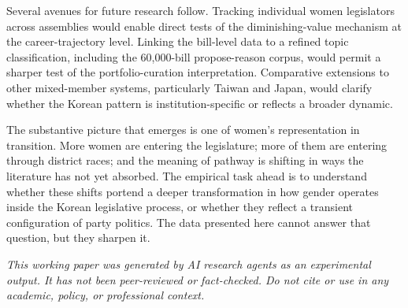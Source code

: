 \documentclass[11pt]{article}
\begin{document}
Several avenues for future research follow. Tracking individual women legislators across assemblies would enable direct tests of the diminishing-value mechanism at the career-trajectory level. Linking the bill-level data to a refined topic classification, including the 60,000-bill propose-reason corpus, would permit a sharper test of the portfolio-curation interpretation. Comparative extensions to other mixed-member systems, particularly Taiwan and Japan, would clarify whether the Korean pattern is institution-specific or reflects a broader dynamic.

The substantive picture that emerges is one of women's representation in transition. More women are entering the legislature; more of them are entering through district races; and the meaning of pathway is shifting in ways the literature has not yet absorbed. The empirical task ahead is to understand whether these shifts portend a deeper transformation in how gender operates inside the Korean legislative process, or whether they reflect a transient configuration of party politics. The data presented here cannot answer that question, but they sharpen it.

\bigskip
\noindent\textit{This working paper was generated by AI research agents as an experimental output. It has not been peer-reviewed or fact-checked. Do not cite or use in any academic, policy, or professional context.}



\end{document}
